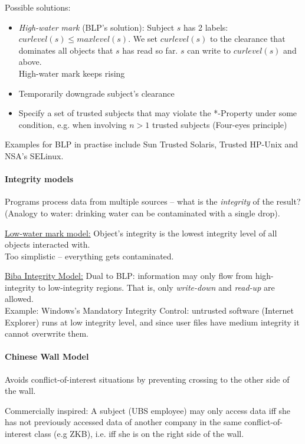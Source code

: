 Possible solutions:
\begin{itemize}
    \item \emph{High-water mark} (BLP's solution): Subject $s$ has 2 labels: $curlevel(s) \leq maxlevel(s)$. We set $curlevel(s)$ to the clearance that dominates all objects that $s$ has read so far. $s$ can write to $curlevel(s)$ and above.\\
    \Lightning\quad High-water mark keeps rising
    \item Temporarily downgrade subject's clearance
    \item Specify a set of trusted subjects that may violate the *-Property under some condition, e.g. when involving $n>1$ trusted subjects (Four-eyes principle)
\end{itemize}

Examples for BLP in practise include Sun Trusted Solaris, Trusted HP-Unix and NSA's SELinux.

\paragraph{Integrity models} Programs process data from multiple sources -- what is the \emph{integrity} of the result? (Analogy to water: drinking water can be contaminated with a single drop).

\underline{Low-water mark model:} Object's integrity is the lowest integrity level of all objects interacted with. \\
\Lightning\quad Too simplistic -- everything gets contaminated.

\underline{Biba Integrity Model:} Dual to BLP: information may only flow from high-integrity to low-integrity regions. That is, only \emph{write-down} and \emph{read-up} are allowed. \\
Example: Windows's Mandatory Integrity Control: untrusted software (Internet Explorer) runs at low integrity level, and since user files have medium integrity it cannot overwrite them.

\paragraph{Chinese Wall Model} Avoids conflict-of-interest situations by preventing crossing to the other side of the wall.

Commercially inspired: A subject (UBS employee) may only access data iff she has not previously accessed data of another company in the same conflict-of-interest class (e.g ZKB), i.e. iff she is on the right side of the wall.

